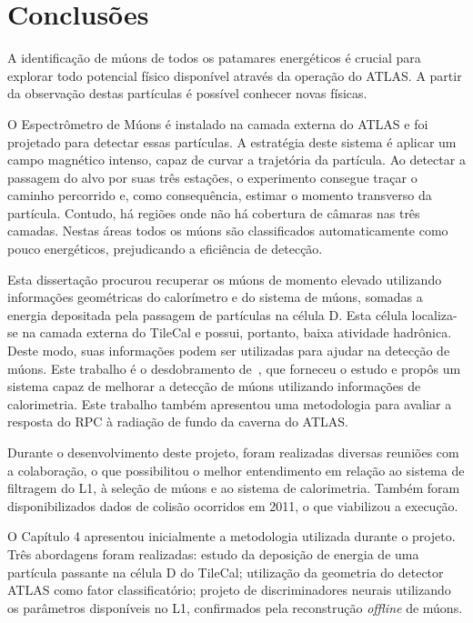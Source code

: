 \chapter{Conclusões}

A identificação de múons de todos os patamares energéticos é crucial para
explorar todo potencial físico disponível através da operação do ATLAS. A partir
da observação destas partículas é possível conhecer novas físicas.

O Espectrômetro de Múons é instalado na camada externa do ATLAS e foi projetado
para detectar essas partículas. A estratégia deste sistema é aplicar um campo
magnético intenso, capaz de curvar a trajetória da partícula. Ao detectar a
passagem do alvo por suas três estações, o experimento consegue traçar o
caminho percorrido e, como consequência, estimar o momento transverso da
partícula. Contudo, há regiões onde não há cobertura de câmaras nas três
camadas. Nestas áreas todos os múons são classificados automaticamente como
pouco energéticos, prejudicando a eficiência de detecção.

Esta dissertação procurou recuperar os múons de momento elevado utilizando
informações geométricas do calorímetro e do sistema de múons, somadas a energia
depositada pela passagem de partículas na célula D. Esta célula localiza-se na
camada externa do TileCal e possui, portanto, baixa atividade hadrônica. Deste
modo, suas informações podem ser utilizadas para ajudar na detecção de múons.
Este trabalho é o desdobramento de~\cite{CIODARO2012}, que forneceu o estudo e
propôs um sistema capaz de melhorar a detecção de múons utilizando informações
de calorimetria. Este trabalho também apresentou uma metodologia para avaliar a
resposta do RPC à radiação de fundo da caverna do ATLAS.

Durante o desenvolvimento deste projeto, foram realizadas diversas reuniões com
a colaboração, o que possibilitou o melhor entendimento em relação ao sistema de
filtragem do L1, à seleção de múons e ao sistema de calorimetria. Também foram
disponibilizados dados de colisão ocorridos em 2011, o que viabilizou a
execução.

O Capítulo 4 apresentou inicialmente a metodologia utilizada durante o projeto.
Três abordagens foram realizadas:  estudo da deposição de energia de uma
partícula passante na célula D do TileCal; utilização da geometria do detector
ATLAS como fator classificatório; projeto de discriminadores neurais
utilizando os parâmetros disponíveis no L1, confirmados pela reconstrução
\emph{offline} de múons.

